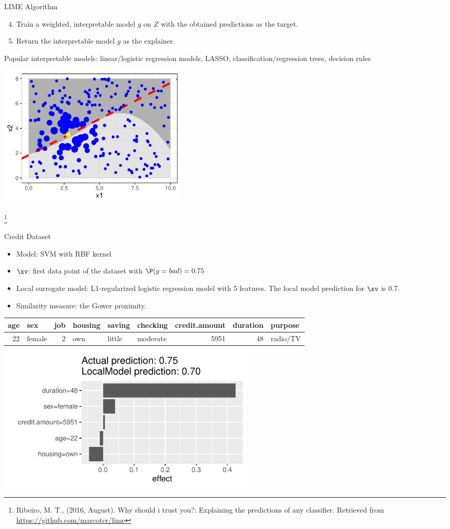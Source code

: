 \documentclass[11pt,compress,t,notes=noshow, xcolor=table]{beamer}
\begin{document}
\begin{vbframe}{LIME Algorithm}
		\framebreak
		\begin{enumerate}
			\setcounter{enumi}{3}
		\item Train a weighted, interpretable model $g$ on $Z$ with the obtained predictions as the target.
		\item Return the interpretable model $g$ as the explainer. \\[0.3cm]
			\end{enumerate}
		Popular interpretable models: linear/logistic regression models, LASSO, classification/regression trees, decision rules
		\begin{center}
			\includegraphics[width=0.4\textwidth]{figure/lime5}
		\end{center}
		\footnote[frame]{Ribeiro, M. T., (2016, August). Why should i trust you?: Explaining the predictions of any classifier. Retrieved from \url{https://github.com/marcotcr/lime}}
\end{vbframe}

\begin{vbframe}{Credit Dataset}
	\begin{itemize}
		\item Model: SVM with RBF kernel
		\item $\xv$: first data point of the dataset with $\hat{\P}(y = bad) = 0.75$
		\item Local surrogate model: L1-regularized logistic regression model with 5 features. The local model prediction for $\xv$ is 0.7. 
		\item Similarity measure: the Gower proximity. 
	\end{itemize}
\vspace{-0.5cm}
	\begin{table}[ht]
		\centering
		\scriptsize
		\begin{tabular}{rlrlllrrl}
			\hline
			age & sex & job & housing & saving & checking & credit.amount & duration & purpose \\ 
			\hline
			 22 & female &   2 & own & little & moderate & 5951 &  48 & radio/TV \\ 
			\hline
		\end{tabular}
	\end{table}
\begin{center}
	\includegraphics[width=0.55\textwidth]{figure/lime_credit.pdf}
\end{center}
\end{vbframe}
\end{document}
